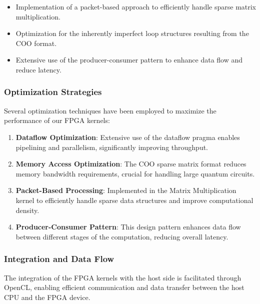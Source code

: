 \documentclass[12pt,oneside,a4paper]{article}
\begin{document}
\begin{itemize}
    \item Implementation of a packet-based approach to efficiently handle sparse matrix multiplication.
    \item Optimization for the inherently imperfect loop structures resulting from the COO format.
    \item Extensive use of the producer-consumer pattern to enhance data flow and reduce latency.
\end{itemize}

\subsubsection{Optimization Strategies}

Several optimization techniques have been employed to maximize the performance of our FPGA kernels:

\begin{enumerate}
    \item \textbf{Dataflow Optimization}: Extensive use of the dataflow pragma enables pipelining and parallelism, significantly improving throughput.

    \item \textbf{Memory Access Optimization}: The COO sparse matrix format reduces memory bandwidth requirements, crucial for handling large quantum circuits.

    \item \textbf{Packet-Based Processing}: Implemented in the Matrix Multiplication kernel to efficiently handle sparse data structures and improve computational density.

    \item \textbf{Producer-Consumer Pattern}: This design pattern enhances data flow between different stages of the computation, reducing overall latency.
\end{enumerate}

\subsubsection{Integration and Data Flow}
The integration of the FPGA kernels with the host side is facilitated through OpenCL, enabling efficient communication and data transfer between the host CPU and the FPGA device.

\end{document}
